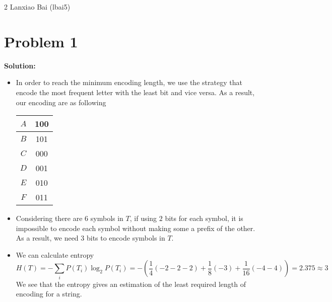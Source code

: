 \documentclass[11pt]{article}
\begin{document}
\homework
    {2}
    {Lanxiao Bai (lbai5)}
    {}

\section*{Problem 1}
\textbf{Solution:} 
	\begin{itemize}
		\item In order to reach the minimum encoding length, we use the strategy that encode the most frequent letter with the least bit and vice versa. As a result, our encoding are as following
		\begin{center}
			\begin{tabular}{c c}
				$A$ & 100\\
				\hline
				$B$ & 101\\
				\hline
				$C$ & 000\\
				\hline
				$D$ & 001\\
				\hline
				$E$ & 010\\
				\hline
				$F$ & 011
			\end{tabular}
		\end{center}
		\item Considering there are $6$ symbols in $T$, if using $2$ bits for each symbol, it is impossible to encode each symbol without making some a prefix of the other. As a result, we need $3$ bits to encode symbols in $T$.
		\item We can calculate entropy
			\[H(T) = -\sum_i P(T_i)\log_2 P(T_i) = -(\frac{1}{4}(-2 - 2 - 2) + \frac{1}{8}(-3) + \frac{1}{16}(-4 - 4)) = 2.375 \approx 3\]
		We see that the entropy gives an estimation of the least required length of encoding for a string.
	\end{itemize}
\end{document}
